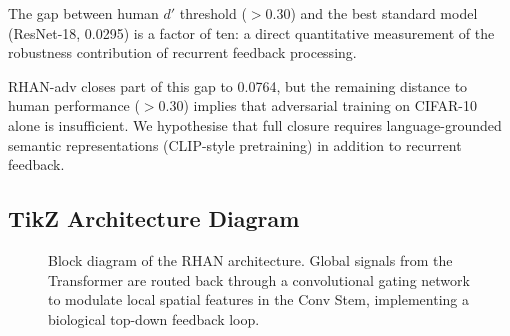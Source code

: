 \documentclass[12pt,a4paper]{article}
\begin{document}
The gap between human $d'$ threshold ($>0.30$) and the best standard model
(ResNet-18, 0.0295) is a factor of ten: a direct quantitative measurement
of the robustness contribution of recurrent feedback processing.

RHAN-adv closes part of this gap to 0.0764, but the remaining distance to
human performance ($>0.30$) implies that adversarial training on CIFAR-10
alone is insufficient.
We hypothesise that full closure requires language-grounded semantic
representations (CLIP-style pretraining) in addition to recurrent feedback.

\subsection{TikZ Architecture Diagram}

\begin{figure}[H]
\centering
{}
\caption{Block diagram of the RHAN architecture.
Global signals from the Transformer are routed back through a convolutional
gating network to modulate local spatial features in the Conv Stem,
implementing a biological top-down feedback loop.}
\label{fig:tikz_rhan}
\end{figure}
\end{document}
